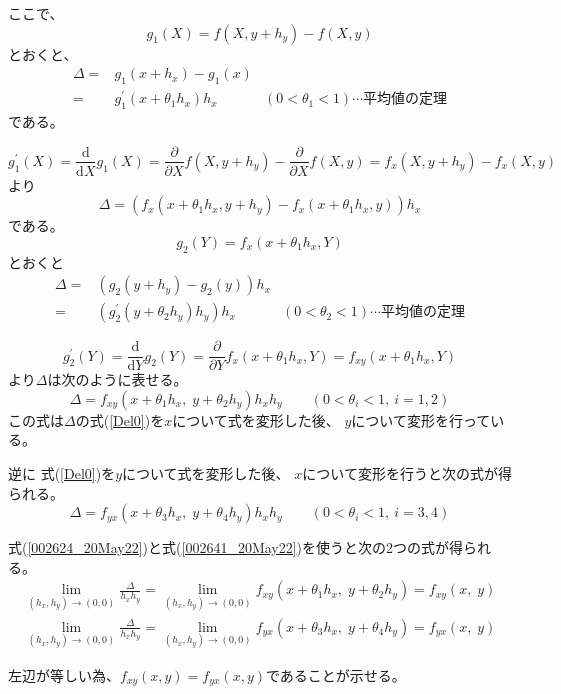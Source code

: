 \documentclass[12pt,b5paper]{ltjsarticle}
\begin{document}
ここで、
\begin{equation}
 g_1(X) = f(X,y+h_y)-f(X,y)
\end{equation}
とおくと、
\begin{align}
 \Delta =& g_1(x+h_x) - g_1(x)\\
 =& g_1^{\prime}(x+\theta_1 h_x)h_x & (0<\theta_1<1) \cdots \text{平均値の定理}
\end{align}
である。

\begin{equation}
 g_1^{\prime}(X)
  = \frac{\mathrm{d}}{\mathrm{d}X}g_1(X)
  = \frac{\partial}{\partial X}f(X,y+h_y)-\frac{\partial}{\partial X}f(X,y)
  = f_x(X,y+h_y)-f_x(X,y)
\end{equation}
より
\begin{equation}
 \Delta = ( f_x(x+\theta_1 h_x, y+h_y) - f_x(x+\theta_1 h_x, y) )h_x
\end{equation}
である。
\begin{equation}
 g_2(Y) = f_x(x+\theta_1 h_x,Y)
\end{equation}
とおくと
\begin{align}
 \Delta =& ( g_2(y+h_y) - g_2(y) )h_x\\
 =& ( g_2^{\prime}(y+\theta_2h_y)h_y )h_x & (0<\theta_2<1) \cdots \text{平均値の定理}
\end{align}

\begin{equation}
 g_2^{\prime}(Y) = \frac{\mathrm{d}}{\mathrm{d}Y}g_2(Y)
  = \frac{\partial}{\partial Y}f_x(x+\theta_1h_x,Y)
  = f_{xy}(x+\theta_1h_x, Y)
\end{equation}
より$\Delta$は次のように表せる。
\begin{equation}
 \Delta = f_{xy}(x+\theta_1 h_x,\; y+\theta_2h_y)h_xh_y \qquad (0<\theta_i<1, \ i=1,2)
  \label{002624_20May22}
\end{equation}
この式は$\Delta$の式(\ref{Del0})を$x$について式を変形した後、
$y$について変形を行っている。

逆に
式(\ref{Del0})を$y$について式を変形した後、
$x$について変形を行うと次の式が得られる。
\begin{equation}
 \Delta = f_{yx}(x+\theta_3 h_x,\; y+\theta_4h_y)h_xh_y \qquad (0<\theta_i<1, \ i=3,4)\label{002641_20May22}
\end{equation}

式(\ref{002624_20May22})と式(\ref{002641_20May22})を使うと次の2つの式が得られる。
\begin{align}
 \lim_{(h_x,h_y)\rightarrow(0,0)}\frac{\Delta}{h_xh_y}
 = \lim_{(h_x,h_y)\rightarrow(0,0)}f_{xy}(x+\theta_1 h_x,\; y+\theta_2h_y)
 = f_{xy}(x,\; y)\\
 \lim_{(h_x,h_y)\rightarrow(0,0)}\frac{\Delta}{h_xh_y}
 = \lim_{(h_x,h_y)\rightarrow(0,0)}f_{yx}(x+\theta_3 h_x,\; y+\theta_4h_y)
 = f_{yx}(x,\; y)
\end{align}

左辺が等しい為、$f_{xy}(x,y)=f_{yx}(x,y)$であることが示せる。
\end{document}
